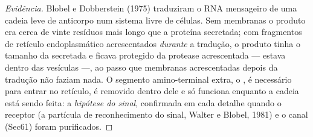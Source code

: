 \begin{proof}[Evidência]
Blobel e Dobberstein (1975) traduziram o RNA mensageiro de uma cadeia
leve de anticorpo num sistema livre de células. Sem membranas o produto
era cerca de vinte resíduos mais longo que a proteína secretada; com
fragmentos de retículo endoplasmático acrescentados \emph{durante} a
tradução, o produto tinha o tamanho da secretada e ficava protegido da
protease acrescentada --- estava dentro das vesículas ---, ao passo que
membranas acrescentadas depois da tradução não faziam nada. O segmento
amino-terminal extra, o , é necessário para entrar no
retículo, é removido dentro dele e só funciona enquanto a cadeia está
sendo feita: a \emph{hipótese do sinal}, confirmada em cada detalhe
quando o receptor (a partícula de reconhecimento do sinal, Walter e
Blobel, 1981) e o canal (Sec61) foram purificados.
\end{proof}

